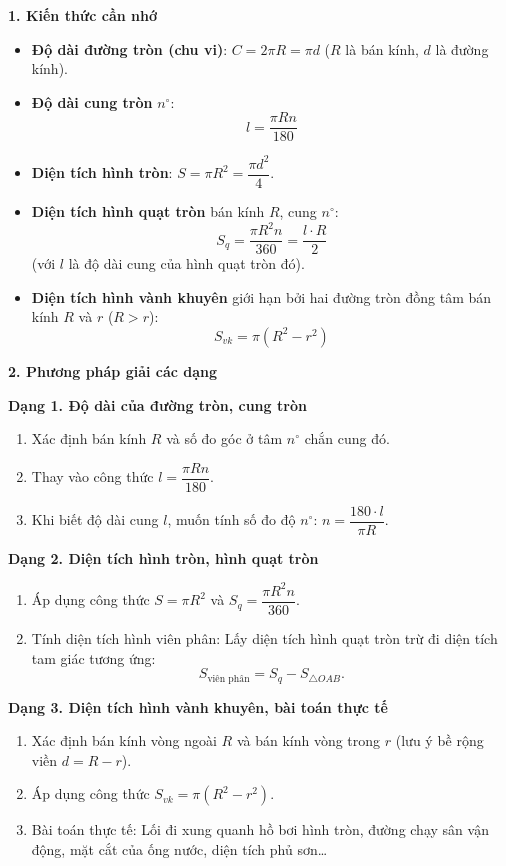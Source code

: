 \textbf{1. Kiến thức cần nhớ}
\begin{itemize}
\item \textbf{Độ dài đường tròn (chu vi)}: $\boxed{C = 2\pi R = \pi d}$ ($R$ là bán kính, $d$ là đường kính).
\item \textbf{Độ dài cung tròn} $n^\circ$:
$$\boxed{l = \dfrac{\pi R n}{180}}$$
\item \textbf{Diện tích hình tròn}: $\boxed{S = \pi R^2 = \dfrac{\pi d^2}{4}}$.
\item \textbf{Diện tích hình quạt tròn} bán kính $R$, cung $n^\circ$:
$$\boxed{S_q = \dfrac{\pi R^2 n}{360} = \dfrac{l \cdot R}{2}}$$
(với $l$ là độ dài cung của hình quạt tròn đó).
\item \textbf{Diện tích hình vành khuyên} giới hạn bởi hai đường tròn đồng tâm bán kính $R$ và $r$ ($R > r$):
$$\boxed{S_{vk} = \pi (R^2 - r^2)}$$
\end{itemize}

\textbf{2. Phương pháp giải các dạng}

\textbf{Dạng 1. Độ dài của đường tròn, cung tròn}
\begin{enumerate}
\item Xác định bán kính $R$ và số đo góc ở tâm $n^\circ$ chắn cung đó.
\item Thay vào công thức $l = \dfrac{\pi R n}{180}$.
\item Khi biết độ dài cung $l$, muốn tính số đo độ $n^\circ$: $\boxed{n = \dfrac{180 \cdot l}{\pi R}}$.
\end{enumerate}

\textbf{Dạng 2. Diện tích hình tròn, hình quạt tròn}
\begin{enumerate}
\item Áp dụng công thức $S = \pi R^2$ và $S_q = \dfrac{\pi R^2 n}{360}$.
\item Tính diện tích hình viên phân: Lấy diện tích hình quạt tròn trừ đi diện tích tam giác tương ứng:
$$S_{\text{viên phân}} = S_q - S_{\triangle OAB}.$$
\end{enumerate}

\textbf{Dạng 3. Diện tích hình vành khuyên, bài toán thực tế}
\begin{enumerate}
\item Xác định bán kính vòng ngoài $R$ và bán kính vòng trong $r$ (lưu ý bề rộng viền $d = R - r$).
\item Áp dụng công thức $S_{vk} = \pi (R^2 - r^2)$.
\item Bài toán thực tế: Lối đi xung quanh hồ bơi hình tròn, đường chạy sân vận động, mặt cắt của ống nước, diện tích phủ sơn\dots
\end{enumerate}
